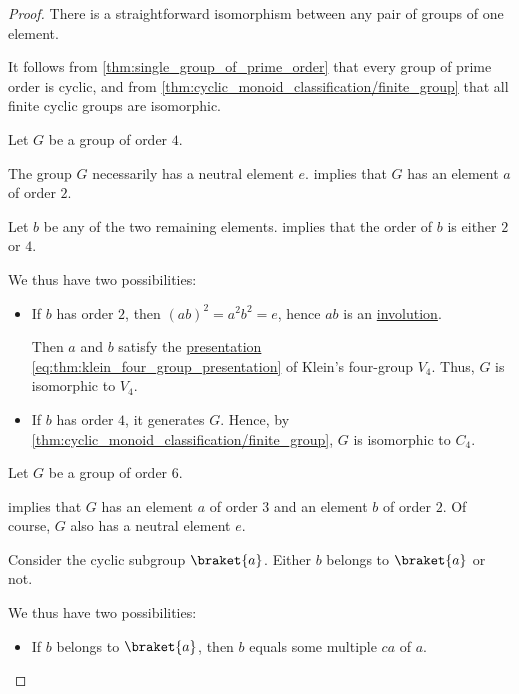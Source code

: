 \begin{proof}
   There is a straightforward isomorphism between any pair of groups of one element.

   It follows from \cref{thm:single_group_of_prime_order} that every group of prime order is cyclic, and from \cref{thm:cyclic_monoid_classification/finite_group} that all finite cyclic groups are isomorphic.

   Let \( G \) be a group of order \( 4 \).

  The group \( G \) necessarily has a neutral element \( e \).  implies that \( G \) has an element \( a \) of order \( 2 \).

  Let \( b \) be any of the two remaining elements.  implies that the order of \( b \) is either \( 2 \) or \( 4 \).

  We thus have two possibilities:
  \begin{itemize}
    \item If \( b \) has order \( 2 \), then \( (ab)^2 = a^2 b^2 = e \), hence \( ab \) is an \hyperref[def:group_element_order]{involution}.

    Then \( a \) and \( b \) satisfy the \hyperref[def:group_presentation]{presentation} \eqref{eq:thm:klein_four_group_presentation} of Klein's four-group \( V_4 \). Thus, \( G \) is isomorphic to \( V_4 \).

    \item If \( b \) has order \( 4 \), it generates \( G \). Hence, by \cref{thm:cyclic_monoid_classification/finite_group}, \( G \) is isomorphic to \( C_4 \).
  \end{itemize}

   Let \( G \) be a group of order \( 6 \).

   implies that \( G \) has an element \( a \) of order \( 3 \) and an element \( b \) of order \( 2 \). Of course, \( G \) also has a neutral element \( e \).

  Consider the cyclic subgroup \( \braket{ a } \). Either \( b \) belongs to \( \braket{ a } \) or not.

  We thus have two possibilities:
  \begin{itemize}
    \item If \( b \) belongs to \( \braket{ a } \), then \( b \) equals some multiple \( ca \) of \( a \).


\end{itemize}
\end{proof}
